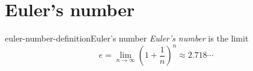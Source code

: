 \documentclass[preview]{standalone}
\begin{document}
\genpage

\section{Euler's number}

\begin{snippetdefinition}{euler-number-definition}{Euler's number}
    \textit{Euler's number} is the limit
    \[
        e = \lim_{n\to\infty} {\left( 1 + \frac{1}{n} \right)}^n \approx 2.718\cdots
    \]
\end{snippetdefinition}
\end{document}
